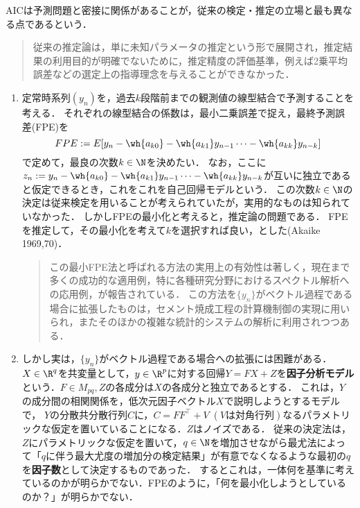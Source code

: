 \documentclass[uplatex,dvipdfmx]{jsreport}
\begin{document}
\begin{history}\label{history-AIC}
    AICは予測問題と密接に関係があることが，従来の検定・推定の立場と最も異なる点であるという．
    \begin{quote}
        従来の推定論は，単に未知パラメータの推定という形で展開され，推定結果の利用目的が明確でないために，推定精度の評価基準，例えば2乗平均誤差などの選定上の指導理念を与えることができなかった．
    \end{quote}
    \begin{enumerate}
        \item 
        定常時系列$(y_n)$を，過去$k$段階前までの観測値の線型結合で予測することを考える．
        それぞれの線型結合の係数は，最小二乗誤差で捉え，最終予測誤差(FPE)を
        \[FPE:=E[y_n-\wh{a_{k0}}-\wh{a_{k1}}y_{n-1}\cdots-\wh{a_{kk}}y_{n-k}]\]
        で定めて，最良の次数$k\in\N$を決めたい．
        なお，ここに$z_n:=y_n-\wh{a_{k0}}-\wh{a_{k1}}y_{n-1}\cdots-\wh{a_{kk}}y_{n-k}$が互いに独立であると仮定できるとき，これをこれを自己回帰モデルという．
        この次数$k\in\N$の決定は従来検定を用いることが考えられていたが，実用的なものは知られていなかった．
        しかしFPEの最小化と考えると，推定論の問題である．
        FPEを推定して，その最小化を考えて$k$を選択すれば良い，とした(Akaike 1969,70)．
        \begin{quote}
            この最小FPE法と呼ばれる方法の実用上の有効性は著しく，現在まで多くの成功的な適用例，特に各種研究分野におけるスペクトル解析への応用例，が報告されている．
            この方法を$\{y_n\}$がベクトル過程である場合に拡張したものは，セメント焼成工程の計算機制御の実現に用いられ，またそのほかの複雑な統計的システムの解析に利用されつつある．
        \end{quote}
        \item しかし実は，$\{y_n\}$がベクトル過程である場合への拡張には困難がある．
        $X\in\R^q$を共変量として，$y\in\R^p$に対する回帰$Y=FX+Z$を\textbf{因子分析モデル}という．$F\in M_{pq},Z$の各成分は$X$の各成分と独立であるとする．
        これは，$Y$の成分間の相関関係を，低次元因子ベクトル$X$で説明しようとするモデルで，
        $Y$の分散共分散行列$C$に，$C=FF^\top+V\;(V\text{は対角行列})$なるパラメトリックな仮定を置いていることになる．$Z$はノイズである．
        従来の決定法は，$Z$にパラメトリックな仮定を置いて，$q\in\N$を増加させながら最尤法によって「$q$に伴う最大尤度の増加分の検定結果」が有意でなくなるような最初の$q$を\textbf{因子数}として決定するものであった．
        するとこれは，一体何を基準に考えているのかが明らかでない．FPEのように，「何を最小化しようとしているのか？」が明らかでない．

\end{enumerate}
\end{history}
\end{document}

